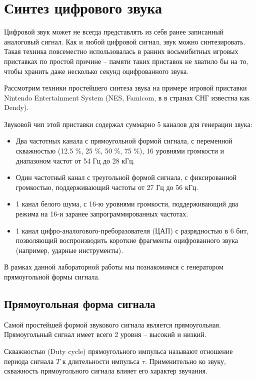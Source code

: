 \section{Синтез цифрового звука}

Цифровой звук может не всегда представлять из себя ранее записанный аналоговый сигнал.
Как и любой цифровой сигнал, звук можно синтезировать.
Такая техника повсеместно использовалась в ранних восьмибитных игровых приставках по простой причине -- памяти таких приставок не хватило бы на то, чтобы хранить даже несколько секунд оцифрованного звука.

Рассмотрим техники простейшего синтеза звука на примере игровой приставки Nintendo Entertainment System (NES, Famicom, в в странах СНГ известна как Dendy).

Звуковой чип этой приставки содержал суммарно 5 каналов для генерации звука:

\begin{itemize}
	\item Два частотных канала с прямоугольной формой сигнала, с переменной скважностью (12.5 \%, 25 \%, 50 \%, 75 \%), 16 уровнями громкости и диапазоном частот от 54 Гц до 28 кГц.
	\item Один частотный канал с треугольной формой сигнала, с фиксированной громкостью, поддерживающий частоты от 27 Гц до 56 кГц.
	\item 1 канал белого шума, с 16-ю уровнями громкости, поддерживающий два режима на 16-и заранее запрограммированных частотах. 
	\item 1 канал цифро-аналогового-преборазователя (ЦАП) с разрядностью в 6 бит, позволяющий воспроизводить короткие фрагменты оцифрованного звука (например, ударные инструменты).

\end{itemize}

В рамках данной лабораторной работы мы познакомимся с генератором прямоугольной формы сигнала.

\subsection{Прямоугольная форма сигнала}

Самой простейшей формой звукового сигнала является прямоугольная. Прямоугольный сигнал имеет всего 2 уровня -- высокий и низкий. 


Скважностью (Duty cycle) прямоугольного импульса называют отношение периода сигнала $T$ к длительности импульса $\tau$. Применительно ко звуку, скважность прямоугольного сигнала влияет его характер звучания.


